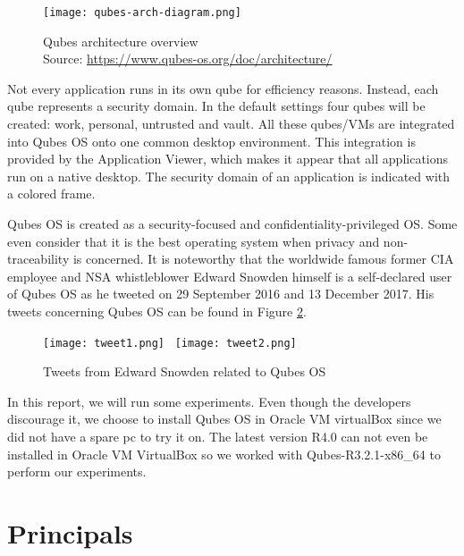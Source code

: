 \documentclass[runningheads,a4paper]{article}
\begin{document}
\begin{figure}[h]
 \centering
 \texttt{[image: qubes-arch-diagram.png]}
 \caption{Qubes architecture overview\\
 Source: \protect\url{https://www.qubes-os.org/doc/architecture/}}
 \label{fig:qubesarch}
\end{figure}

Not every application runs in its own qube for efficiency reasons. Instead,
each qube represents a security domain. In the default settings four
qubes will be created: work, personal, untrusted and vault. All these
qubes/VMs are integrated into Qubes OS onto one common desktop
environment. This integration is provided by the Application Viewer, which
makes it appear that all applications run on a native desktop. The
security domain of an application is indicated with a colored frame.

Qubes OS is created as a security-focused and confidentiality-privileged OS. Some even consider that it is the best operating system when privacy and non-traceability is concerned. It is noteworthy that the worldwide famous former CIA employee and NSA whistleblower Edward Snowden himself is a self-declared user of Qubes OS as he tweeted on 29 September 2016 and 13 December 2017. His tweets concerning Qubes OS can be found in Figure \ref{fig:tweets}.

\begin{figure}[h]
 \centering
 \texttt{[image: tweet1.png]}~
 \texttt{[image: tweet2.png]}
 \caption{Tweets from Edward Snowden related to Qubes OS}
 \label{fig:tweets}
\end{figure}

In this report, we will run some experiments. Even though the developers discourage it, we choose to install Qubes OS in Oracle VM virtualBox since we did not have a spare pc to try it on. The latest version R4.0 can not even be installed in Oracle VM VirtualBox so we worked with Qubes-R3.2.1-x86\_64 to perform our experiments.

\section{Principals} 
\end{document}
